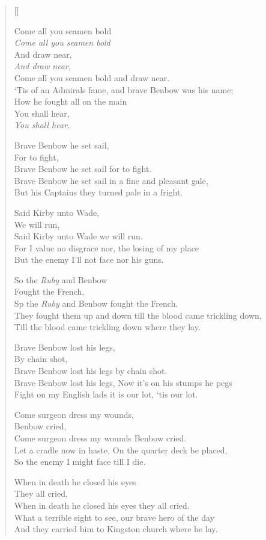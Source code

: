 \pagebreak
\settowidth{\versewidth}{‘Tis of an Admirals fame, and brave Benbow was his name;}
\begin{verse}[\versewidth]
\begin{patverse}
Come all you seamen bold\\
\textit{Come all you seamen bold}\\
And draw near,\\
\textit{And draw near,}\\
Come all you seamen bold and draw near.\\
‘Tis of an Admirals fame, and brave Benbow was his name;\\
How he fought all on the main \\
You shall hear,\\
\textit{You shall hear.}
\end{patverse}

Brave Benbow he set sail,\\
For to fight,\\
Brave Benbow he set sail for to fight.\\
Brave Benbow he set sail in a fine and pleasant gale,\\
But his Captains they turned pale in a fright.

Said Kirby unto Wade,\\
We will run,\\
Said Kirby unto Wade we will run.\\
For I value no disgrace nor, the losing of my place\\
But the enemy I'll not face nor his guns.

So the \textit{Ruby} and Benbow\\
Fought the French,\\
Sp the \textit{Ruby} and Benbow fought the French.\\
They fought them up and down till the blood came trickling down,\\
Till the blood came trickling down where they lay.


Brave Benbow lost his legs,\\
By chain shot,\\
Brave Benbow lost his legs by chain shot.\\
Brave Benbow lost his legs, Now it's on his stumps he pegs\\
Fight on my English lads it is our lot, `tis our lot.


Come surgeon dress my wounds,\\
Benbow cried,\\
Come surgeon dress my wounds Benbow cried.\\
Let a cradle now in haste, On the quarter deck be placed,\\
So the enemy I might face till I die.

When in death he closed his eyes\\
They all cried,\\
When in death he closed his eyes they all cried.\\
What a terrible sight to see, our brave hero of the day\\
And they carried him to Kingston church where he lay.
\end{verse}